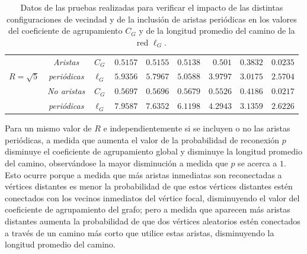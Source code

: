 \begin{table}[!ht]
\begin{center}
{\begin{tabular}{|c|c|c|c|c|c|c|c|c|}
 & \emph{Aristas} & $C_G$ & \multicolumn{1}{|r|}{$0$.$5157$} & \multicolumn{1}{|r|}{$0$.$5155$} & \multicolumn{1}{|r|}{$0$.$5138$} & \multicolumn{1}{|r|}{$0$.$501$} & \multicolumn{1}{|r|}{$0$.$3832$} & \multicolumn{1}{|r|}{$0$.$0235$} \\\cline{3-9}
 
$R=\sqrt{5}$ & \emph{peri\'odicas} & $\ell_G$ & \multicolumn{1}{|r|}{$5$.$9356$} & \multicolumn{1}{|r|}{$5$.$7967$} & \multicolumn{1}{|r|}{$5$.$0588$} & \multicolumn{1}{|r|}{$3$.$9797$} & \multicolumn{1}{|r|}{$3$.$0175$} & \multicolumn{1}{|r|}{$2$.$5704$} \\\cline{2-9}

 & \emph{No aristas} & $C_G$ & \multicolumn{1}{|r|}{$0$.$5697$} & \multicolumn{1}{|r|}{$0$.$5696$} & \multicolumn{1}{|r|}{$0$.$5679$} & \multicolumn{1}{|r|}{$0$.$5526$} & \multicolumn{1}{|r|}{$0$.$4186$} & \multicolumn{1}{|r|}{$0$.$0217$} \\\cline{3-9}

 & \emph{peri\'odicas} & $\ell_G$ & \multicolumn{1}{|r|}{$7$.$9587$} & \multicolumn{1}{|r|}{$7$.$6352$} & \multicolumn{1}{|r|}{$6$.$1198$} & \multicolumn{1}{|r|}{$4$.$2943$} & \multicolumn{1}{|r|}{$3$.$1359$} & \multicolumn{1}{|r|}{$2$.$6226$} \\\hline
\end{tabular}}
\end{center}\vspace*{-0.6cm}
\caption[Datos de las pruebas realizadas para verificar el impacto de las distintas configuraciones de vecindad y de la inclusi\'on de aristas peri\'odicas en las propiedades del grafo]{Datos de las pruebas realizadas para verificar el impacto de las distintas configuraciones de vecindad y de la inclusi\'on de aristas peri\'odicas en los valores del coeficiente de agrupamiento $C_G$ y de la longitud promedio del camino de la red $\ell_G$. }
\label{table-network-data}
\end{table}

Para un mismo valor de $R$ e independientemente si se incluyen o no las aristas peri\'odicas, a medida que aumenta el valor de la probabilidad de reconexi\'on $p$ disminuye el coeficiente de agrupamiento global y disminuye la longitud promedio del camino, observ\'andose la mayor disminuci\'on a medida que $p$ se acerca a $1$. Esto ocurre porque a medida que m\'as aristas inmediatas son reconectadas a v\'ertices distantes es menor la probabilidad de que estos v\'ertices distantes est\'en conectados con los vecinos inmediatos del v\'ertice focal, disminuyendo el valor del coeficiente de agrupamiento del grafo; pero a medida que aparecen m\'as aristas distantes aumenta la probabilidad de que dos v\'ertices aleatorios est\'en conectados a trav\'es de un camino m\'as corto que utilice estas aristas, disminuyendo la longitud promedio del camino.

